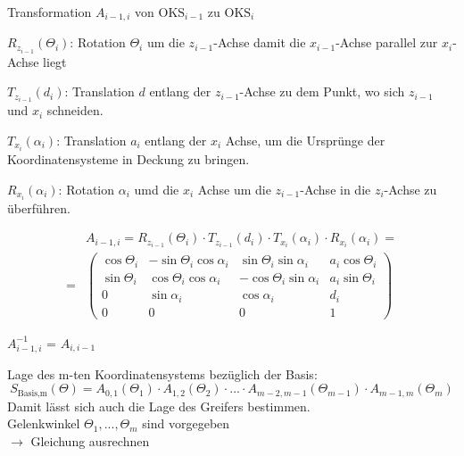 Transformation $A_{i-1,i}$ von $\text{OKS}_{i-1}$ zu $\text{OKS}_i$
\begin{compactitem}
    \item $R_{z_{i-1}}(\Theta_i)$: Rotation $\Theta_{i}$ um die $z_{i-1}$-Achse damit die $x_{i-1}$-Achse parallel zur
    $x_{i}$-Achse liegt
    \item $T_{z_{i-1}}(d_i)$: Translation $d$ entlang der $z_{i-1}$-Achse zu dem Punkt, wo sich $z_{i-1}$ und $x_{i}$
    schneiden.
    \item $T_{x_i}(\alpha_i)$: Translation $a_i$ entlang der $x_i$ Achse, um die Ursprünge der Koordinatensysteme in
    Deckung zu bringen.
    \item $R_{x_i}(\alpha_i)$: Rotation $\alpha_{i}$ umd die $x_{i}$ Achse um die $z_{i-1}$-Achse in die
    $z_{i}$-Achse zu überführen.
\end{compactitem}
\begin{align}
    &A_{i-1,i} = R_{z_{i-1}}(\Theta_i) \cdot T_{z_{i-1}}(d_i) \cdot T_{x_i}(\alpha_i) \cdot R_{x_i}(\alpha_i) = \\
    =&\begin{pmatrix} \cos\Theta_i&-\sin\Theta_i\cos\alpha_i&\sin\Theta_i\sin\alpha_i&a_i\cos\Theta_i \\ \sin\Theta_i&\cos\Theta_i\cos\alpha_i &-\cos\Theta_i\sin\alpha_i &a_i\sin\Theta_i \\ 0&\sin\alpha_i&\cos\alpha_i&d_i \\0&0&0&1 \end{pmatrix}
\end{align}

$A^{-1}_{i-1,i}$ = $A_{i,i-1}$

Lage des m-ten Koordinatensystems bezüglich der Basis:
\begin{displaymath}
     S_\text{Basis,m}(\Theta) = A_{0,1}(\Theta_1) \cdot A_{1,2}(\Theta_2) \cdot ... \cdot
     A_{m-2,m-1}(\Theta_{m-1}) \cdot A_{m-1,m}(\Theta_m)
\end{displaymath}
Damit lässt sich auch die Lage des Greifers bestimmen. \\
Gelenkwinkel $\Theta_1, ... ,\Theta_m$ sind vorgegeben \\
$\rightarrow$ Gleichung ausrechnen

